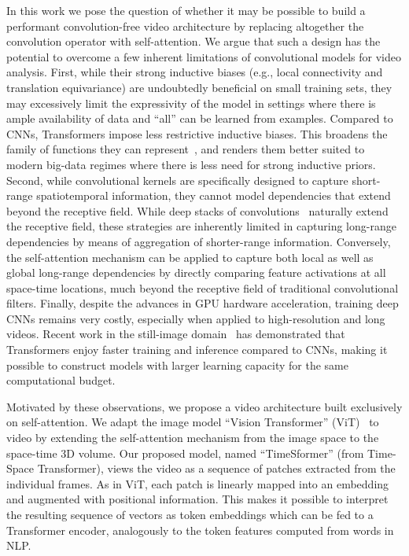 \documentclass{article}
\begin{document}
In this work we pose the question of whether it may be possible to build a performant convolution-free video architecture by replacing altogether the convolution operator with self-attention. We argue that such a design has the potential to overcome a few inherent limitations of convolutional models for video analysis. First, while their strong inductive biases (e.g., local connectivity and translation equivariance) are undoubtedly beneficial on small training sets, they may excessively limit the expressivity of the model in settings where there is ample availability of data and ``all'' can be learned from examples. Compared to CNNs, Transformers impose less restrictive inductive biases. This broadens the family of functions they can represent~\cite{Cordonnier:ICLR2020, Zhao:CVPR2020}, and renders them better suited to modern big-data regimes where there is less need for strong inductive priors. Second, while convolutional kernels are specifically designed to capture short-range spatiotemporal information, they cannot model dependencies that extend beyond the receptive field. While deep stacks of convolutions~\cite{Simonyan14c, 43022, DBLP:conf/cvpr/CarreiraZ17} naturally extend the receptive field, these strategies are inherently limited in capturing long-range dependencies by means of aggregation of shorter-range information. Conversely, the self-attention mechanism can be applied to capture both local as well as global long-range dependencies by directly comparing feature activations at all space-time locations, much beyond the receptive field of traditional convolutional filters. Finally, despite the advances in GPU hardware acceleration, training deep CNNs remains very costly, especially when applied to high-resolution and long videos. Recent work in the still-image domain~\cite{Dosovitskiy:ICLR2021, DETR, Zhao:CVPR2020} has demonstrated that Transformers enjoy faster training and inference compared to CNNs,  making it possible to construct models with larger learning capacity for the same computational budget. 

Motivated by these observations, we propose a video architecture built exclusively on self-attention. We adapt the image model ``Vision Transformer'' (ViT)~\cite{Dosovitskiy:ICLR2021} to video by extending the self-attention mechanism from the image space to the space-time 3D volume. Our proposed model, named ``TimeSformer'' (from Time-Space Transformer), views the video as a sequence of patches extracted from the individual frames. As in ViT, each patch is linearly mapped into an embedding and augmented with positional information. This makes it possible to interpret the resulting sequence of vectors as token embeddings which can be fed to a Transformer encoder, analogously to the token features computed from words in NLP. 
\end{document}
